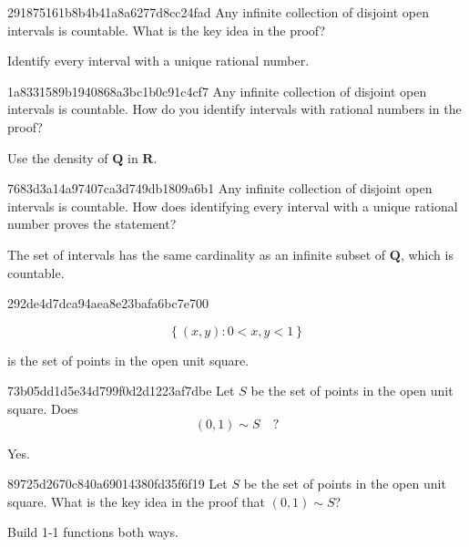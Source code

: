 \begin{note}{291875161b8b4b41a8a6277d8cc24fad}
    Any infinite collection of disjoint open intervals is countable.
    What is the key idea in the proof?

    \begin{cloze}{1}
        Identify every interval with a unique rational number.
    \end{cloze}
\end{note}

\begin{note}{1a8331589b1940868a3bc1b0c91c4cf7}
    Any infinite collection of disjoint open intervals is countable.
    How do you identify intervals with rational numbers in the proof?

    \begin{cloze}{1}
        Use the density of \({ \mathbf{Q} }\) in \({ \mathbf{R} }\).
    \end{cloze}
\end{note}

\begin{note}{7683d3a14a97407ca3d749db1809a6b1}
    Any infinite collection of disjoint open intervals is countable.
    How does identifying every interval with a unique rational number proves the statement?

    \begin{cloze}{1}
        The set of intervals has the same cardinality as an infinite subset of \({ \mathbf{Q} }\), which is countable.
    \end{cloze}
\end{note}

\begin{note}{292de4d7dca94aea8e23bafa6bc7e700}
    \begin{icloze}{1}
        \[
            \left\{ (x, y) : 0 < x, y < 1 \right\}
        \]
    \end{icloze}
    is the set of points in the open unit square.
\end{note}

\begin{note}{73b05dd1d5e34d799f0d2d1223af7dbe}
    Let \({ S }\) be the set of points in the open unit square. Does
    \[
        (0, 1) \sim S \quad ?
    \]

    \begin{cloze}{1}
        Yes.
    \end{cloze}
\end{note}

\begin{note}{89725d2670c840a69014380fd35f6f19}
    Let \({ S }\) be the set of points in the open unit square.
    What is the key idea in the proof that \({ (0, 1) \sim S }\)?

    \begin{cloze}{1}
        Build 1-1 functions both ways.
    \end{cloze}
\end{note}

